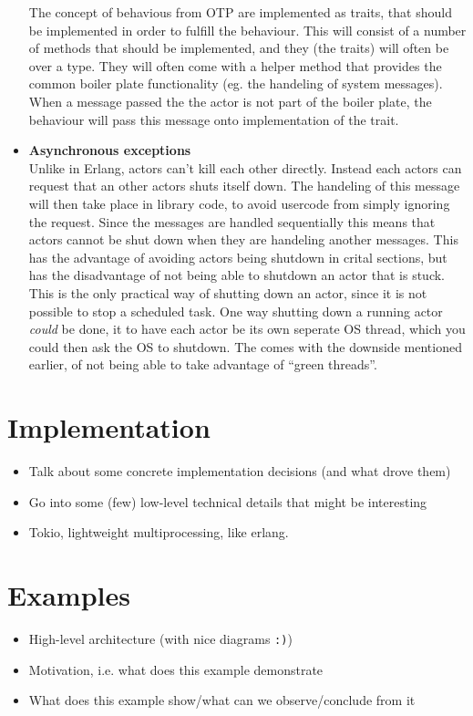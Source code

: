 \documentclass[a4paper]{article}
\begin{document}
\begin{itemize}
  The concept of behavious from OTP are implemented as traits, that should be
  implemented in order to fulfill the behaviour. This will consist of a number
  of methods that should be implemented, and they (the traits) will often be
  over a type. They will often come with a helper method that provides the
  common boiler plate functionality (eg. the handeling of system messages). When
  a message passed the the actor is not part of the boiler plate, the behaviour
  will pass this message onto implementation of the trait.
\item \textbf{Asynchronous exceptions}\\ %
  Unlike in Erlang, actors can't kill each other directly. Instead each
  actors can request that an other actors shuts itself down. The handeling of
  this message will then take place in library code, to avoid usercode from
  simply ignoring the request. Since the messages are handled sequentially this
  means that actors cannot be shut down when they are handeling another
  messages. This has the advantage of avoiding actors being shutdown in crital
  sections, but has the disadvantage of not being able to shutdown an actor that
  is stuck. This is the only practical way of shutting down an actor, since it
  is not possible to stop a scheduled task. One way shutting down a running
  actor \textit{could} be done, it to have each actor be its own seperate OS
  thread, which you could then ask the OS to shutdown. The comes with the
  downside mentioned earlier, of not being able to take advantage of ``green
  threads''.
\end{itemize}

\section{Implementation}
\begin{itemize}
\item Talk about some concrete implementation decisions (and what drove them)
\item Go into some (few) low-level technical details that might be interesting
\item Tokio, lightweight multiprocessing, like erlang.
\end{itemize}

\section{Examples}
\begin{itemize}
\item High-level architecture (with nice diagrams \texttt{:)})
\item Motivation, i.e. what does this example demonstrate
\item What does this example show/what can we observe/conclude from it
\end{itemize}
\end{document}
